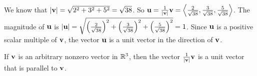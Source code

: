 \begin{exercises}
\begin{exerciseSolution}
    \item We know that $|\mathbf{v}| = \sqrt{2^2+3^2+5^2} = \sqrt{38}$. So $\mathbf{u} = \frac{1}{|\mathbf{v}|} \mathbf{v} = \left\langle \frac{2}{\sqrt{38}}, \frac{3}{\sqrt{38}}, \frac{5}{\sqrt{38}} \right\rangle$. The magnitude of $\mathbf{u}$ is $|\mathbf{u}| = \sqrt{\left(\frac{2}{\sqrt{38}}\right)^2  + \left(\frac{3}{\sqrt{38}}\right)^2 + \left(\frac{5}{\sqrt{38}}\right)^2} = 1$. Since $\mathbf{u}$ is a positive scalar multiple of $\mathbf{v}$, the vector $\mathbf{u}$ is a unit vector in the direction of $\mathbf{v}$. 

    \item If $\mathbf{v}$ is an arbitrary nonzero vector in $\mathbb{R}^3$, then the vector $\frac{1}{|\mathbf{v}|} \mathbf{v}$ is a unit vector that is parallel to $\mathbf{v}$.

    \ea
\end{exerciseSolution}

\end{exercises}

\afterexercises
